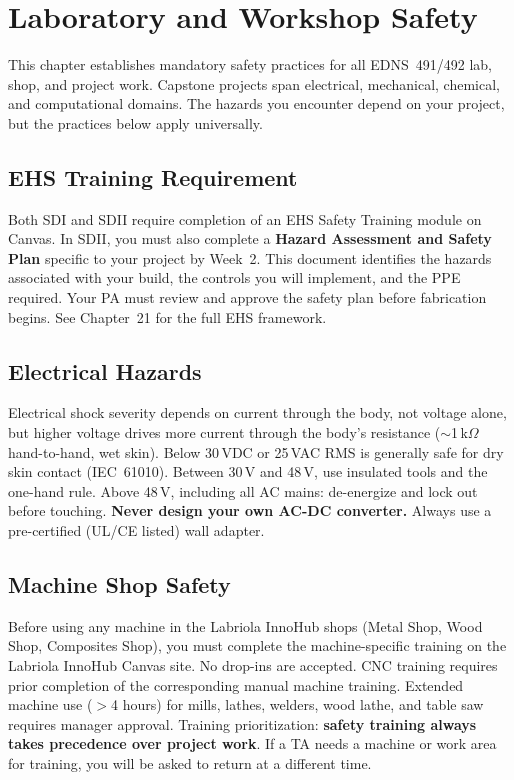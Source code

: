 \chapter*{Laboratory and Workshop Safety}

This chapter establishes mandatory safety practices for all EDNS~491/492 lab, shop, and project work. Capstone projects span electrical, mechanical, chemical, and computational domains. The hazards you encounter depend on your project, but the practices below apply universally.

\section*{EHS Training Requirement}
Both SDI and SDII require completion of an EHS Safety Training module on Canvas. In SDII, you must also complete a \textbf{Hazard Assessment and Safety Plan} specific to your project by Week~2. This document identifies the hazards associated with your build, the controls you will implement, and the PPE required. Your PA must review and approve the safety plan before fabrication begins. See Chapter~21 for the full EHS framework.

\section*{Electrical Hazards}
Electrical shock severity depends on current through the body, not voltage alone, but higher voltage drives more current through the body's resistance ($\sim$1\,k$\Omega$ hand-to-hand, wet skin). Below 30\,VDC or 25\,VAC RMS is generally safe for dry skin contact (IEC~61010). Between 30\,V and 48\,V, use insulated tools and the one-hand rule. Above 48\,V, including all AC mains: de-energize and lock out before touching. \textbf{Never design your own AC-DC converter.} Always use a pre-certified (UL/CE listed) wall adapter.

\section*{Machine Shop Safety}
Before using any machine in the Labriola InnoHub shops (Metal Shop, Wood Shop, Composites Shop), you must complete the machine-specific training on the Labriola InnoHub Canvas site. No drop-ins are accepted. CNC training requires prior completion of the corresponding manual machine training. Extended machine use ($>$4 hours) for mills, lathes, welders, wood lathe, and table saw requires manager approval. Training prioritization: \textbf{safety training always takes precedence over project work}. If a TA needs a machine or work area for training, you will be asked to return at a different time.

